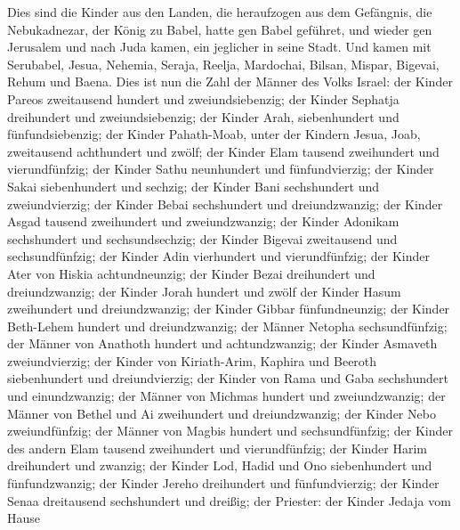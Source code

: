  Dies sind die Kinder aus den Landen, die heraufzogen aus
dem Gefängnis, die Nebukadnezar, der König zu Babel, hatte gen Babel
geführet, und wieder gen Jerusalem und nach Juda kamen, ein jeglicher in
seine Stadt.  Und kamen mit Serubabel, Jesua, Nehemia,
Seraja, Reelja, Mardochai, Bilsan, Mispar, Bigevai, Rehum und Baena.
Dies ist nun die Zahl der Männer des Volks Israel:  der
Kinder Pareos zweitausend hundert und zweiundsiebenzig;  der
Kinder Sephatja dreihundert und zweiundsiebenzig;  der
Kinder Arah, siebenhundert und fünfundsiebenzig;  der Kinder
Pahath-Moab, unter der Kindern Jesua, Joab, zweitausend achthundert und
zwölf;  der Kinder Elam tausend zweihundert und
vierundfünfzig;  der Kinder Sathu neunhundert und
fünfundvierzig;  der Kinder Sakai siebenhundert und sechzig;
 der Kinder Bani sechshundert und zweiundvierzig;
 der Kinder Bebai sechshundert und dreiundzwanzig;
 der Kinder Asgad tausend zweihundert und zweiundzwanzig;
 der Kinder Adonikam sechshundert und sechsundsechzig;
 der Kinder Bigevai zweitausend und sechsundfünfzig;
 der Kinder Adin vierhundert und vierundfünfzig;
 der Kinder Ater von Hiskia achtundneunzig; 
der Kinder Bezai dreihundert und dreiundzwanzig;  der
Kinder Jorah hundert und zwölf  der Kinder Hasum
zweihundert und dreiundzwanzig;  der Kinder Gibbar
fünfundneunzig;  der Kinder Beth-Lehem hundert und
dreiundzwanzig;  der Männer Netopha sechsundfünfzig;
 der Männer von Anathoth hundert und achtundzwanzig;
 der Kinder Asmaveth zweiundvierzig;  der
Kinder von Kiriath-Arim, Kaphira und Beeroth siebenhundert und
dreiundvierzig;  der Kinder von Rama und Gaba sechshundert
und einundzwanzig;  der Männer von Michmas hundert und
zweiundzwanzig;  der Männer von Bethel und Ai zweihundert
und dreiundzwanzig;  der Kinder Nebo zweiundfünfzig;
 der Männer von Magbis hundert und sechsundfünfzig;
 der Kinder des andern Elam tausend zweihundert und
vierundfünfzig;  der Kinder Harim dreihundert und zwanzig;
 der Kinder Lod, Hadid und Ono siebenhundert und
fünfundzwanzig;  der Kinder Jereho dreihundert und
fünfundvierzig;  der Kinder Senaa dreitausend sechshundert
und dreißig;  der Priester: der Kinder Jedaja vom Hause
